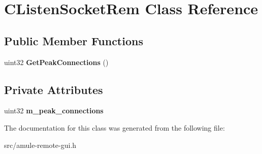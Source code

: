 \section{CListenSocketRem Class Reference}
\label{classCListenSocketRem}
\subsection*{Public Member Functions}
\begin{DoxyCompactItemize}
\item 
uint32 {\bfseries GetPeakConnections} ()\label{classCListenSocketRem_a164ff171bfa1bac36df4ab2a8f7ef5ca}

\end{DoxyCompactItemize}
\subsection*{Private Attributes}
\begin{DoxyCompactItemize}
\item 
uint32 {\bfseries m\_\-peak\_\-connections}\label{classCListenSocketRem_a761bd46181885082771afb2f2667e0b9}

\end{DoxyCompactItemize}


The documentation for this class was generated from the following file:\begin{DoxyCompactItemize}
\item 
src/amule-\/remote-\/gui.h\end{DoxyCompactItemize}
